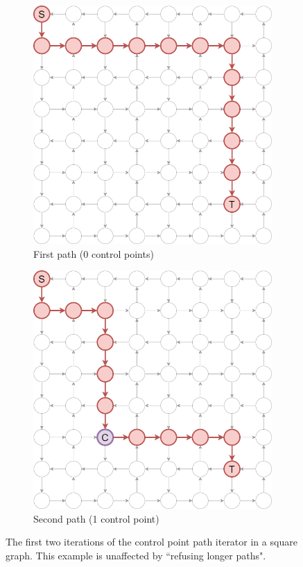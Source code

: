 \begin{figure}[ht]
\begin{subfigure}{.5\textwidth}
  \centering
\includegraphics[width=0.8\linewidth]{images/pathiterators/examples-Control point-1.png}
  \caption{First path (0 control points)}
\end{subfigure}
\begin{subfigure}{.5\textwidth}
  \centering
\includegraphics[width=0.8\linewidth]{images/pathiterators/examples-Control point-2.png}
  \caption{Second path (1 control point)}
\end{subfigure}
\caption{The first two iterations of the control point path iterator in a square graph. This example is unaffected by ``refusing longer paths".}
\label{fig:pathexamples-controlpoint}
\end{figure}